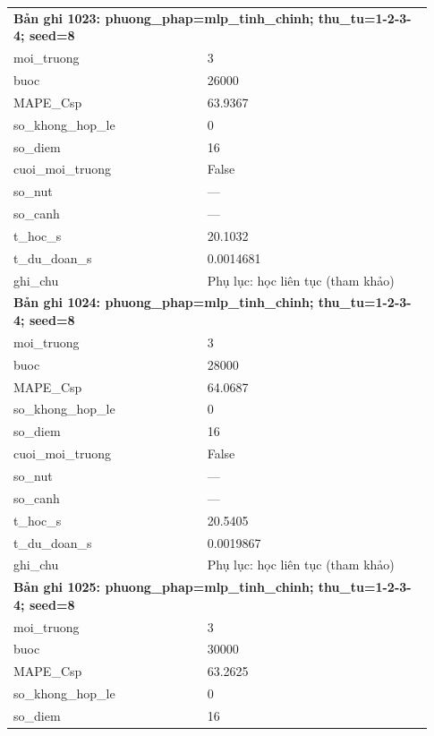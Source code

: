 \begin{longtable}{p{0.43\linewidth}p{0.50\linewidth}}
\midrule
\multicolumn{2}{p{0.95\linewidth}}{\textbf{Bản ghi 1023: phuong\_phap=mlp\_tinh\_chinh; thu\_tu=1-2-3-4; seed=8}} \\
moi\_\allowbreak truong & 3 \\
buoc & 26000 \\
MAPE\_\allowbreak Csp & 63.9367 \\
so\_\allowbreak khong\_\allowbreak hop\_\allowbreak le & 0 \\
so\_\allowbreak diem & 16 \\
cuoi\_\allowbreak moi\_\allowbreak truong & False \\
so\_\allowbreak nut & — \\
so\_\allowbreak canh & — \\
t\_\allowbreak hoc\_\allowbreak s & 20.1032 \\
t\_\allowbreak du\_\allowbreak doan\_\allowbreak s & 0.0014681 \\
ghi\_\allowbreak chu & Phụ lục: học liên tục (tham khảo) \\
\midrule
\multicolumn{2}{p{0.95\linewidth}}{\textbf{Bản ghi 1024: phuong\_phap=mlp\_tinh\_chinh; thu\_tu=1-2-3-4; seed=8}} \\
moi\_\allowbreak truong & 3 \\
buoc & 28000 \\
MAPE\_\allowbreak Csp & 64.0687 \\
so\_\allowbreak khong\_\allowbreak hop\_\allowbreak le & 0 \\
so\_\allowbreak diem & 16 \\
cuoi\_\allowbreak moi\_\allowbreak truong & False \\
so\_\allowbreak nut & — \\
so\_\allowbreak canh & — \\
t\_\allowbreak hoc\_\allowbreak s & 20.5405 \\
t\_\allowbreak du\_\allowbreak doan\_\allowbreak s & 0.0019867 \\
ghi\_\allowbreak chu & Phụ lục: học liên tục (tham khảo) \\
\midrule
\multicolumn{2}{p{0.95\linewidth}}{\textbf{Bản ghi 1025: phuong\_phap=mlp\_tinh\_chinh; thu\_tu=1-2-3-4; seed=8}} \\
moi\_\allowbreak truong & 3 \\
buoc & 30000 \\
MAPE\_\allowbreak Csp & 63.2625 \\
so\_\allowbreak khong\_\allowbreak hop\_\allowbreak le & 0 \\
so\_\allowbreak diem & 16 \\

\end{longtable}
